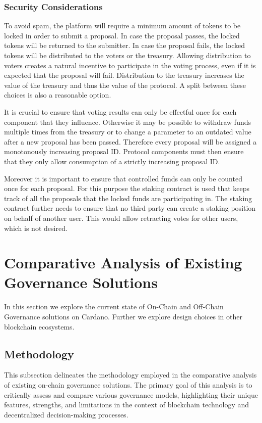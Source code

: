 \documentclass[11pt]{article}
\begin{document}
\subsubsection{Security Considerations}

To avoid spam, the platform will require a minimum amount of tokens to be locked in order to submit a proposal.
In case the proposal passes, the locked tokens will be returned to the submitter.
In case the proposal fails, the locked tokens will be distributed to the voters or the treasury.
Allowing distribution to voters creates a natural incentive to participate in the voting process, even if it is expected that the proposal will fail.
Distribution to the treasury increases the value of the treasury and thus the value of the protocol.
A split between these choices is also a reasonable option.

It is crucial to ensure that voting results can only be effectful once for each component that they influence.
Otherwise it may be possible to withdraw funds multiple times from the treasury or to change a parameter to an outdated value after a new proposal has been passed.
Therefore every proposal will be assigned a monotonously increasing proposal ID.
Protocol components must then ensure that they only allow consumption of a strictly increasing proposal ID.

Moreover it is important to ensure that controlled funds can only be counted once for each proposal.
For this purpose the staking contract is used that keeps track of all the proposals that the locked funds are participating in.
The staking contract further needs to ensure that no third party can create a staking position on behalf of another user.
This would allow retracting votes for other users, which is not desired.

\section{Comparative Analysis of Existing Governance Solutions}

In this section we explore the current state of On-Chain and Off-Chain Governance solutions on Cardano.
Further we explore design choices in other blockchain ecosystems.

\subsection{Methodology}
This subsection delineates the methodology employed in the comparative analysis of existing on-chain governance solutions.
The primary goal of this analysis is to critically assess and compare various governance models,
highlighting their unique features, strengths, and limitations in the context of blockchain technology and decentralized decision-making processes.
\end{document}
